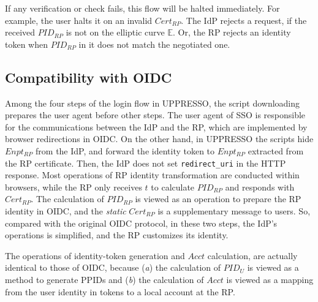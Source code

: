 If any verification or check fails,
     this flow will be halted immediately.
For example, the user halts it
    on an invalid $Cert_{RP}$.
The IdP rejects a request, if the received $PID_{RP}$ is not on the elliptic curve $\mathbb{E}$.
Or, the RP rejects an identity token
    when $PID_{RP}$ in it does not match the negotiated one.



\subsection{Compatibility with OIDC}
\label{subsec:compatible}

Among the four steps of the login flow in UPPRESSO,
    the script downloading prepares the user agent before other steps.
The user agent of SSO is responsible for the communications between the IdP and the RP,
    which are implemented by browser redirections in OIDC.
On the other hand, in UPPRESSO the scripts hide $Enpt_{RP}$ from the IdP,
    and forward the identity token to $Enpt_{RP}$ extracted from the RP certificate.
Then, the IdP does not set \verb+redirect_uri+ in the HTTP response. %
Most operations of RP identity transformation are conducted within browsers,
 while the RP only receives $t$ to calculate $PID_{RP}$ and responds with  $Cert_{RP}$.
The calculation of $PID_{RP}$ is viewed as an operation to prepare the RP identity in OIDC,
    and the \emph{static} $Cert_{RP}$ is a supplementary message to users.
So, compared with the original OIDC protocol, in these two steps, the IdP's operations is simplified,
    and the RP customizes its identity.

The operations of identity-token generation and $Acct$ calculation,
    are actually identical to those of OIDC,
    because (\emph{a}) the calculation of $PID_U$ is viewed as a method to generate PPIDs
        and (\emph{b}) the calculation of $Acct$ is viewed as a mapping from the user identity in tokens
                    to a local account at the RP.

